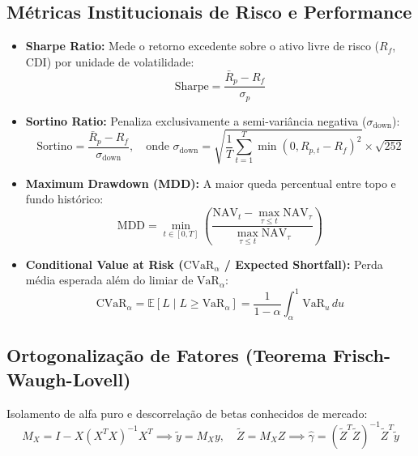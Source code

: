 \documentclass[11pt,a4paper]{article}
\begin{document}
\subsection{Métricas Institucionais de Risco e Performance}
\begin{itemize}[leftmargin=1.5em]
    \item \textbf{Sharpe Ratio:} Mede o retorno excedente sobre o ativo livre de risco ($R_f$, CDI) por unidade de volatilidade:
    \begin{equation}
    \text{Sharpe} = \frac{\bar{R}_p - R_f}{\sigma_p}
    \end{equation}
    \item \textbf{Sortino Ratio:} Penaliza exclusivamente a semi-variância negativa ($\sigma_{\text{down}}$):
    \begin{equation}
    \text{Sortino} = \frac{\bar{R}_p - R_f}{\sigma_{\text{down}}}, \quad \text{onde } \sigma_{\text{down}} = \sqrt{\frac{1}{T}\sum_{t=1}^T \min(0, R_{p,t} - R_f)^2} \times \sqrt{252}
    \end{equation}
    \item \textbf{Maximum Drawdown (MDD):} A maior queda percentual entre topo e fundo histórico:
    \begin{equation}
    \text{MDD} = \min_{t \in [0, T]} \left( \frac{\text{NAV}_t - \max_{\tau \le t} \text{NAV}_\tau}{\max_{\tau \le t} \text{NAV}_\tau} \right)
    \end{equation}
    \item \textbf{Conditional Value at Risk ($\text{CVaR}_\alpha$ / Expected Shortfall):} Perda média esperada além do limiar de $\text{VaR}_\alpha$:
    \begin{equation}
    \text{CVaR}_\alpha = \mathbb{E}\left[ L \mid L \ge \text{VaR}_\alpha \right] = \frac{1}{1-\alpha} \int_\alpha^1 \text{VaR}_u \, du
    \end{equation}
\end{itemize}

\subsection{Ortogonalização de Fatores (Teorema Frisch-Waugh-Lovell)}
Isolamento de alfa puro e descorrelação de betas conhecidos de mercado:
\begin{equation}
M_X = I - X(X^T X)^{-1} X^T \implies \tilde{y} = M_X y, \quad \tilde{Z} = M_X Z \implies \hat{\gamma} = (\tilde{Z}^T \tilde{Z})^{-1} \tilde{Z}^T \tilde{y}
\end{equation}
\end{document}
